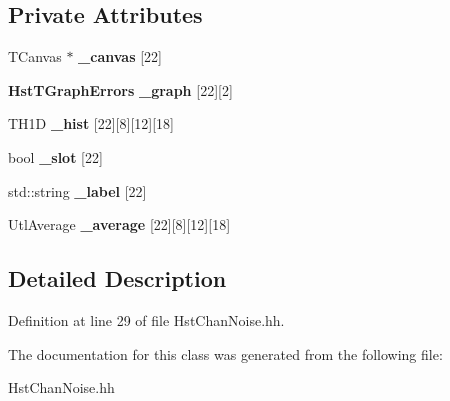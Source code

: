 \subsection*{Private Attributes}
\begin{DoxyCompactItemize}
\item 
T\-Canvas $\ast$ {\bfseries \-\_\-canvas} [22]\label{classHstChanNoise_afca4c54c58f90144d08e96e5a713bb08}

\item 
{\bf Hst\-T\-Graph\-Errors} {\bfseries \-\_\-graph} [22][2]\label{classHstChanNoise_aa8edb46e9f86b2d65e27733f43a97c56}

\item 
T\-H1\-D {\bfseries \-\_\-hist} [22][8][12][18]\label{classHstChanNoise_af5b44ba98a96215f69c9ea43b91609f0}

\item 
bool {\bfseries \-\_\-slot} [22]\label{classHstChanNoise_a3c3276da2e7ad7d8be0d68e4acdd58f9}

\item 
std\-::string {\bfseries \-\_\-label} [22]\label{classHstChanNoise_a2ed69a9688c335106a0695c001048592}

\item 
Utl\-Average {\bfseries \-\_\-average} [22][8][12][18]\label{classHstChanNoise_a616ded317f4c23c9297c8474511515ef}

\end{DoxyCompactItemize}


\subsection{Detailed Description}


Definition at line 29 of file Hst\-Chan\-Noise.\-hh.



The documentation for this class was generated from the following file\-:\begin{DoxyCompactItemize}
\item 
Hst\-Chan\-Noise.\-hh\end{DoxyCompactItemize}
